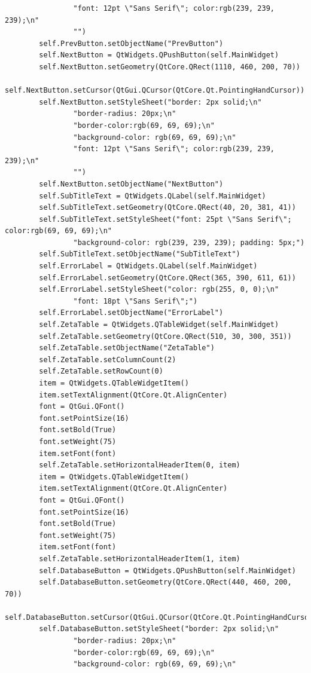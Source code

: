 \documentclass{article}
\begin{document}
\begin{lstlisting}
                "font: 12pt \"Sans Serif\"; color:rgb(239, 239, 239);\n"
                "")
        self.PrevButton.setObjectName("PrevButton")
        self.NextButton = QtWidgets.QPushButton(self.MainWidget)
        self.NextButton.setGeometry(QtCore.QRect(1110, 460, 200, 70))
        self.NextButton.setCursor(QtGui.QCursor(QtCore.Qt.PointingHandCursor))
        self.NextButton.setStyleSheet("border: 2px solid;\n"
                "border-radius: 20px;\n"
                "border-color:rgb(69, 69, 69);\n"
                "background-color: rgb(69, 69, 69);\n"
                "font: 12pt \"Sans Serif\"; color:rgb(239, 239, 239);\n"
                "")
        self.NextButton.setObjectName("NextButton")
        self.SubTitleText = QtWidgets.QLabel(self.MainWidget)
        self.SubTitleText.setGeometry(QtCore.QRect(40, 20, 381, 41))
        self.SubTitleText.setStyleSheet("font: 25pt \"Sans Serif\"; color:rgb(69, 69, 69);\n"
                "background-color: rgb(239, 239, 239); padding: 5px;")
        self.SubTitleText.setObjectName("SubTitleText")
        self.ErrorLabel = QtWidgets.QLabel(self.MainWidget)
        self.ErrorLabel.setGeometry(QtCore.QRect(365, 390, 611, 61))
        self.ErrorLabel.setStyleSheet("color: rgb(255, 0, 0);\n"
                "font: 18pt \"Sans Serif\";")
        self.ErrorLabel.setObjectName("ErrorLabel")
        self.ZetaTable = QtWidgets.QTableWidget(self.MainWidget)
        self.ZetaTable.setGeometry(QtCore.QRect(510, 30, 300, 351))
        self.ZetaTable.setObjectName("ZetaTable")
        self.ZetaTable.setColumnCount(2)
        self.ZetaTable.setRowCount(0)
        item = QtWidgets.QTableWidgetItem()
        item.setTextAlignment(QtCore.Qt.AlignCenter)
        font = QtGui.QFont()
        font.setPointSize(16)
        font.setBold(True)
        font.setWeight(75)
        item.setFont(font)
        self.ZetaTable.setHorizontalHeaderItem(0, item)
        item = QtWidgets.QTableWidgetItem()
        item.setTextAlignment(QtCore.Qt.AlignCenter)
        font = QtGui.QFont()
        font.setPointSize(16)
        font.setBold(True)
        font.setWeight(75)
        item.setFont(font)
        self.ZetaTable.setHorizontalHeaderItem(1, item)
        self.DatabaseButton = QtWidgets.QPushButton(self.MainWidget)
        self.DatabaseButton.setGeometry(QtCore.QRect(440, 460, 200, 70))
        self.DatabaseButton.setCursor(QtGui.QCursor(QtCore.Qt.PointingHandCursor))
        self.DatabaseButton.setStyleSheet("border: 2px solid;\n"
                "border-radius: 20px;\n"
                "border-color:rgb(69, 69, 69);\n"
                "background-color: rgb(69, 69, 69);\n"

\end{lstlisting}
\end{document}
